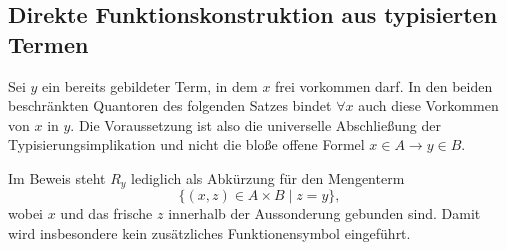 \documentclass[main.tex]{subfiles}
\begin{document}
\begin{tabproof}





\end{tabproof}

\subsection{Direkte Funktionskonstruktion aus typisierten Termen}

Sei \(y\) ein bereits gebildeter Term, in dem \(x\) frei vorkommen darf.
In den beiden beschränkten Quantoren des folgenden Satzes bindet \(\forall x\)
auch diese Vorkommen von \(x\) in \(y\). Die Voraussetzung ist also die
universelle Abschließung der Typisierungsimplikation und nicht die bloße
offene Formel \(x\in A\rightarrow y\in B\).


Im Beweis steht \(R_y\) lediglich als Abkürzung für den Mengenterm
\[
  \bigl\{(x,z)\in A\times B\mid z=y\bigr\},
\]
wobei \(x\) und das frische \(z\) innerhalb der Aussonderung gebunden sind.
Damit wird insbesondere kein zusätzliches Funktionensymbol eingeführt.
\end{document}
